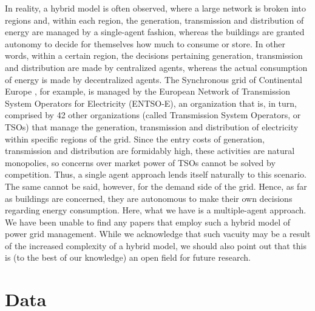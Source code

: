 \documentclass{article}
\begin{document}
In reality, a hybrid model is often observed, where a large network is broken into regions and, within each region, the generation, transmission and distribution of energy are managed by a single-agent fashion, whereas the buildings are granted autonomy to decide for themselves how much to consume or store. In other words, within a certain region, the decisions pertaining generation, transmission and distribution are made by centralized agents, whereas the actual consumption of energy is made by decentralized agents. The Synchronous grid of Continental Europe \cite{SGCE}, for example, is managed by the European Network of Transmission System Operators for Electricity (ENTSO-E), an organization that is, in turn, comprised by 42 other organizations (called Transmission System Operators, or TSOs) that manage the generation, transmission and distribution of electricity within specific regions of the grid. Since the entry costs of generation, transmission and distribution are formidably high, these activities are natural monopolies, so concerns over market power of TSOs cannot be solved by competition. Thus, a single agent approach lends itself naturally to this scenario. The same cannot be said, however, for the demand side of the grid. Hence, as far as buildings are concerned, they are autonomous to make their own decisions regarding energy consumption. Here, what we have is a multiple-agent approach. We have been unable to find any papers that employ such a hybrid model of power grid management. While we acknowledge that such vacuity may be a result of the increased complexity of a hybrid model, we should also point out that this is (to the best of our knowledge) an open field for future research.

\section{Data}
\end{document}
